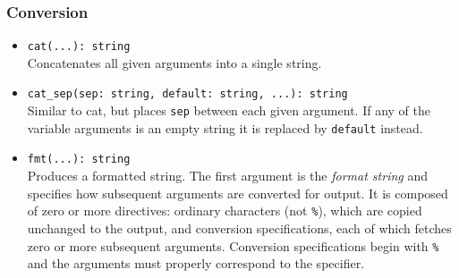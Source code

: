 \documentclass[10pt,landscape]{article}
\begin{document}
\begin{multicols*}{2}
\subsubsection*{Conversion}

\begin{itemize}
  \item \verb|cat(...): string|\\
    Concatenates all given arguments into a single string.
  \item \verb|cat_sep(sep: string, default: string, ...): string|\\
    Similar to cat, but places \texttt{sep} between each given argument.
    If any of the variable arguments is an empty string it is replaced by
    \texttt{default} instead.
  \item \verb|fmt(...): string|\\
    Produces a formatted string. The first argument is the \emph{format string}
    and specifies how subsequent arguments are converted for output. It is
    composed of zero or more directives: ordinary characters (not \verb|%|),
    which are copied unchanged to the output, and conversion specifications,
    each of which fetches zero or more subsequent arguments. Conversion
    specifications begin with \verb|%| and the arguments must properly
    correspond to the specifier.


\end{itemize}
\end{multicols*}
\end{document}
